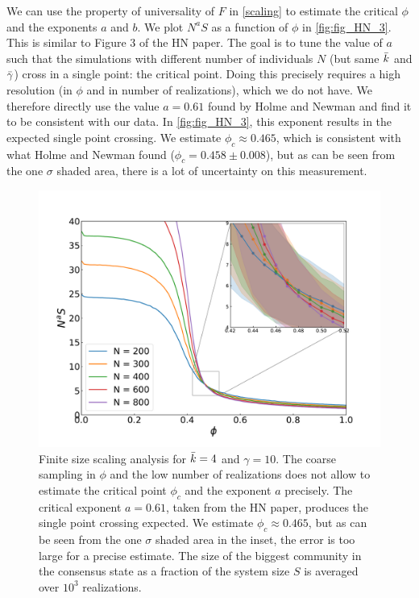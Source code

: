 \documentclass[11pt]{article}
\begin{document}
We can use the property of universality of $F$ in \autoref{scaling} to estimate the critical $\phi$ and the exponents $a$ and $b$. We plot $N^aS$ as a function of $\phi$ in \autoref{fig:fig_HN_3}. This is similar to Figure 3 of the HN paper. The goal is to tune the value of $a$ such that the simulations with different number of individuals $N$ (but same $\Bar{k}$ and $\Bar{\gamma}$) cross in a single point: the critical point. Doing this precisely requires a high resolution (in $\phi$ and in number of realizations), which we do not have. We therefore directly use the value $a=0.61$ found by Holme and Newman and find it to be consistent with our data. In \autoref{fig:fig_HN_3}, this exponent results in the expected single point crossing. We estimate $\phi_c\approx0.465$, which is consistent with what Holme and Newman found ($\phi_c = 0.458 \pm 0.008$), but as can be seen from the one $\sigma$ shaded area, there is a lot of uncertainty on this measurement. 
\begin{figure}[h]
    \centering
    \includegraphics[width = 0.8\linewidth]{figures/Fig3_withInsert.pdf}
    \caption{Finite size scaling analysis for $\Bar{k}= 4$ and $\gamma = 10$. The coarse sampling in $\phi$ and the low number of realizations does not allow to estimate the critical point $\phi_c$ and the exponent $a$ precisely. The critical exponent $a=0.61$, taken from the HN paper, produces the single point crossing expected. We estimate $\phi_c \approx 0.465$, but as can be seen from the one $\sigma$ shaded area in the inset, the error is too large for a precise estimate. The size of the biggest community in the consensus state as a fraction of the system size $S$ is averaged over $10^3$ realizations.
}
    \label{fig:fig_HN_3}
\end{figure}
\end{document}
